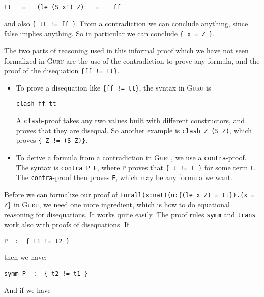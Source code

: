 \documentclass{book}[12pt]
\newcommand{\guru}[0]{\textsc{Guru}\xspace}
\begin{document}
\begin{verbatim}
tt   =   (le (S x') Z)   =    ff 
\end{verbatim}

\noindent and also \texttt{\{ tt != ff \}}.  From a contradiction we
can conclude anything, since false implies anything.  So in particular
we can conclude \texttt{\{ x = Z \}}.

The two parts of reasoning used in this informal proof which we have
not seen formalized in \guru are the use of the contradiction to prove
any formula, and the proof of the disequation \texttt{\{ff != tt\}}.  

\begin{itemize}

\item To prove a disequation like \texttt{\{ff != tt\}}, the syntax in \guru is

\begin{verbatim}
clash ff tt
\end{verbatim}

\noindent A \texttt{clash}-proof takes any two values built with
different constructors, and proves that they are disequal.  So another
example is \texttt{clash Z (S Z)}, which proves \texttt{\{ Z != (S
Z)\}}.  

\item To derive a formula from a contradiction in \guru, we use a
\texttt{contra}-proof.  The syntax is \texttt{contra P F}, where
\texttt{P} proves that \texttt{\{ t != t \}} for some term \texttt{t}.
The \texttt{contra}-proof then proves \texttt{F}, which may be any
formula we want.

\end{itemize}

\noindent Before we can formalize our proof of \texttt{Forall(x:nat)(u:\{(le x
Z) = tt\}).\{x = Z\}} in \guru, we need one more ingredient, which is
how to do equational reasoning for disequations.  It works quite easily.
The proof rules \texttt{symm} and \texttt{trans} work also with
proofs of disequations.  If 

\begin{verbatim}
P  :  { t1 != t2 }
\end{verbatim}

\noindent then we have:

\begin{verbatim}
symm P  :  { t2 != t1 }
\end{verbatim}

\noindent And if we have 
\end{document}
